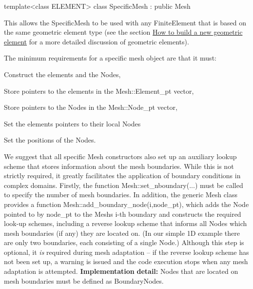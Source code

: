 \begin{DoxyCode}
\textcolor{keyword}{template}<\textcolor{keyword}{class} ELEMENT>
\textcolor{keyword}{class }SpecificMesh : \textcolor{keyword}{public} Mesh
\end{DoxyCode}


This allows the {\ttfamily Specific\+Mesh} to be used with any {\ttfamily Finite\+Element} that is based on the same geometric element type (see the section \hyperlink{index_FEgeom}{How to build a new geometric element} for a more detailed discussion of geometric elements).

The minimum requirements for a specific mesh object are that it must\+:
\begin{DoxyItemize}
\item Construct the elements and the {\ttfamily Nodes},
\item Store pointers to the elements in the {\ttfamily Mesh\+::\+Element\+\_\+pt} vector,
\item Store pointers to the {\ttfamily Nodes} in the {\ttfamily Mesh\+::\+Node\+\_\+pt} vector,
\item Set the elements\textquotesingle{} pointers to their local {\ttfamily Nodes} 
\item Set the positions of the {\ttfamily Nodes}.
\end{DoxyItemize}We suggest that all specific {\ttfamily Mesh} constructors also set up an auxiliary lookup scheme that stores information about the mesh boundaries. While this is not strictly required, it greatly facilitates the application of boundary conditions in complex domains. Firstly, the function {\ttfamily Mesh\+::set\+\_\+nboundary}(...) must be called to specify the number of mesh boundaries. In addition, the generic {\ttfamily Mesh} class provides a function {\ttfamily Mesh\+::add\+\_\+boundary\+\_\+node(i,node\+\_\+pt)}, which adds the {\ttfamily Node} pointed to by {\ttfamily node\+\_\+pt} to the {\ttfamily Mesh\textquotesingle{}s} i-\/th boundary and constructs the required look-\/up schemes, including a reverse lookup scheme that informs all {\ttfamily Nodes} which mesh boundaries (if any) they are located on. (In our simple 1D example there are only two boundaries, each consisting of a single Node.) Although this step is optional, it {\itshape is} required during mesh adaptation -- if the reverse lookup scheme has not been set up, a warning is issued and the code execution stops when any mesh adaptation is attempted. {\bfseries Implementation} {\bfseries detail\+:} {\ttfamily Nodes} that are located on mesh boundaries must be defined as {\ttfamily Boundary\+Nodes}.

